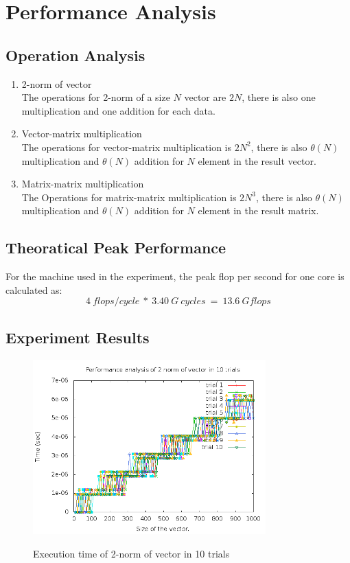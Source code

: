 \documentclass{article}
\begin{document}
\newpage
\section{Performance Analysis}

\subsection{Operation Analysis}
\begin{enumerate}
\item 2-norm of vector\\
    The operations for 2-norm of a size $N$ vector are $2N$, there is also one multiplication and one
    addition for each data.
\item Vector-matrix multiplication\\
    The operations for vector-matrix multiplication is $2N^2$,  there is also $\theta(N)$ multiplication
    and $\theta(N)$ addition for $N$ element in the result vector.
\item Matrix-matrix multiplication\\
    The Operations for matrix-matrix multiplication is $2N^3$,  there is also $\theta(N)$ multiplication
    and $\theta(N)$ addition for $N$ element in the result matrix.
\end{enumerate}

\subsection{Theoratical Peak Performance}
For the machine used in the experiment, the peak flop per second for one core is calculated as:\\
\begin{equation*}
4\:flops/cycle\:*\:3.40\:G\:cycles\:=\:13.6\:Gflops 
\end{equation*}

\subsection{Experiment Results}
    \begin{figure}[th!]
        \centering
        \includegraphics[width=0.8\textwidth]{timingTwoNorm.png}
        \label{fig:timeTwoNorm}
        \caption{Execution time of 2-norm of vector in 10 trials}
    \end{figure}
\end{document}
